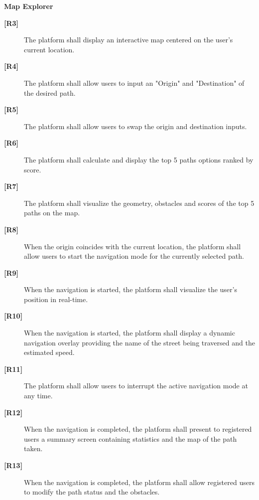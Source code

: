 \noindent
\textbf{Map Explorer}
\begin{description}
    \item[\textbf{[R3]}] The platform shall display an interactive map centered on the user's current location.
    \item[\textbf{[R4]}] The platform shall allow users to input an "Origin" and "Destination" of the desired path.
    \item[\textbf{[R5]}] The platform shall allow users to swap the origin and destination inputs.
    \item[\textbf{[R6]}] The platform shall calculate and display the top 5 paths options ranked by score.
    \item[\textbf{[R7]}] The platform shall visualize the geometry, obstacles and scores of the top 5 paths on the map.
    \item[\textbf{[R8]}] When the origin coincides with the current location, the platform shall allow users to start the navigation mode for the currently selected path.
    \item[\textbf{[R9]}] When the navigation is started, the platform shall visualize the user's position in real-time.
    \item[\textbf{[R10]}] When the navigation is started, the platform shall display a dynamic navigation overlay providing the name of the street being traversed and the estimated speed.

    \item[\textbf{[R11]}] The platform shall allow users to interrupt the active navigation mode at any time.

    \item[\textbf{[R12]}]  When the navigation is completed, the platform shall present to registered users a summary screen containing statistics and the map of the path taken.

    \item[\textbf{[R13]}] When the navigation is completed, the platform shall allow registered users to modify the path status and the obstacles.
\end{description}

